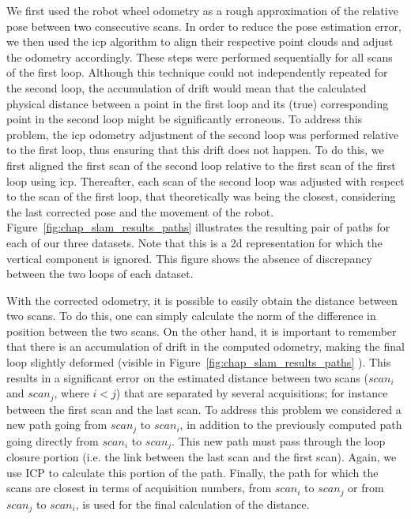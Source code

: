 We first used the robot wheel odometry as a rough approximation of the relative pose between two consecutive scans. In order to reduce the pose estimation error, we then used the \gls*{icp} algorithm to align their respective point clouds and adjust the odometry accordingly. These steps were performed sequentially for all scans of the first loop. Although this technique could not independently repeated for the second loop, the accumulation of drift would mean that the calculated physical distance between a point in the first loop and its (true) corresponding point in the second loop might be significantly erroneous. To address this problem, the \gls*{icp} odometry adjustment of the second loop was performed relative to the first loop, thus ensuring that this drift does not happen. To do this, we first aligned the first scan of the second loop relative to the first scan of the first loop using \gls*{icp}. Thereafter, each scan of the second loop was adjusted with respect to the scan of the first loop, that theoretically was being the closest, considering the last corrected pose and the movement of the robot. Figure~\ref{fig:chap_slam_results_paths} illustrates the resulting pair of paths for each of our three datasets. Note that this is a \gls*{2d} representation for which the vertical component is ignored. This figure shows the absence of discrepancy between the two loops of each dataset.

With the corrected odometry, it is possible to easily obtain the distance between two scans. To do this, one can simply calculate the norm of the difference in position between the two scans. On the other hand, it is important to remember that there is an accumulation of drift in the computed odometry, making the final loop slightly deformed (visible in Figure~\ref{fig:chap_slam_results_paths} \protect{} \protect{}). This results in a significant error on the estimated distance between two scans ($scan_i$ and $scan_j$, where $i<j$) that are separated by several acquisitions; for instance between the first scan and the last scan. To address this problem we considered a new path going from $scan_j$ to $scan_i$, in addition to the previously computed path going directly from $scan_i$ to $scan_j$. This new path must pass through the loop closure portion (i.e. the link between the last scan and the first scan). Again, we use ICP to calculate this portion of the path. Finally, the path for which the scans are closest in terms of acquisition numbers, from $scan_i$ to $scan_j$ or from $scan_j$ to $scan_i$, is used for the final calculation of the distance.

